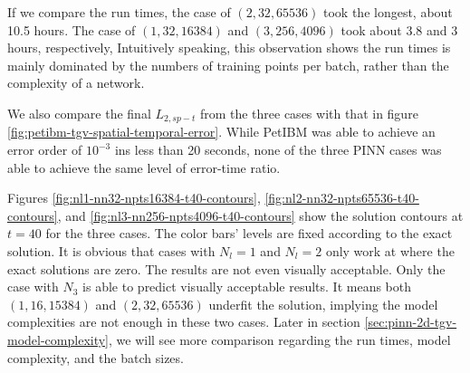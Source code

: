 If we compare the run times, the case of $(2, 32, 65536)$ took the longest, about 10.5 hours.
The case of $(1, 32, 16384)$ and $(3, 256, 4096)$ took about 3.8 and 3 hours, respectively,
Intuitively speaking, this observation shows the run times is mainly dominated by the numbers of training points per batch, rather than the complexity of a network.

We also compare the final $L_{2,sp-t}$ from the three cases with that in figure \ref{fig:petibm-tgv-spatial-temporal-error}.
While PetIBM was able to achieve an error order of $10^{-3}$ ins less than 20 seconds, none of the three PINN cases was able to achieve the same level of error-time ratio.

Figures \ref{fig:nl1-nn32-npts16384-t40-contours}, \ref{fig:nl2-nn32-npts65536-t40-contours}, and \ref{fig:nl3-nn256-npts4096-t40-contours} show the solution contours at $t=40$ for the three cases.
The color bars' levels are fixed according to the exact solution.
It is obvious that cases with $N_l=1$ and $N_l=2$ only work at where the exact solutions are zero.
The results are not even visually acceptable.
Only the case with $N_3$ is able to predict visually acceptable results.
It means both $(1, 16, 15384)$ and $(2, 32, 65536)$ underfit the solution, implying the model complexities are not enough in these two cases.
Later in section \ref{sec:pinn-2d-tgv-model-complexity}, we will see more comparison regarding the run times, model complexity, and the batch sizes.
